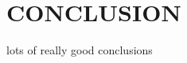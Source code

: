 \documentclass[letterpaper, 10 pt, conference]{ieeeconf}  %
\begin{document}

\section{CONCLUSION}

lots of really good conclusions









\end{document}
